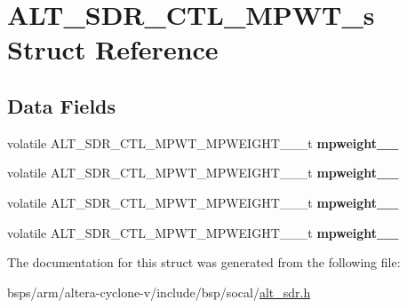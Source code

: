\hypertarget{structALT__SDR__CTL__MPWT__s}{}\section{A\+L\+T\+\_\+\+S\+D\+R\+\_\+\+C\+T\+L\+\_\+\+M\+P\+W\+T\+\_\+s Struct Reference}
\label{structALT__SDR__CTL__MPWT__s}
\subsection*{Data Fields}
\begin{DoxyCompactItemize}
\item 
\mbox{\label{structALT__SDR__CTL__MPWT__s_a8217dca5a6d326567c57b4a605819ce1}} 
volatile A\+L\+T\+\_\+\+S\+D\+R\+\_\+\+C\+T\+L\+\_\+\+M\+P\+W\+T\+\_\+\+M\+P\+W\+E\+I\+G\+H\+T\+\_\+\_\+\_\+t {\bfseries mpweight\+\_\+\_}
\item 
\mbox{\label{structALT__SDR__CTL__MPWT__s_adb50c502a3e5c5439330502b0781d3ba}} 
volatile A\+L\+T\+\_\+\+S\+D\+R\+\_\+\+C\+T\+L\+\_\+\+M\+P\+W\+T\+\_\+\+M\+P\+W\+E\+I\+G\+H\+T\+\_\+\_\+\_\+t {\bfseries mpweight\+\_\+\_}
\item 
\mbox{\label{structALT__SDR__CTL__MPWT__s_a573f146a5c4249771c9cef588979ef70}} 
volatile A\+L\+T\+\_\+\+S\+D\+R\+\_\+\+C\+T\+L\+\_\+\+M\+P\+W\+T\+\_\+\+M\+P\+W\+E\+I\+G\+H\+T\+\_\+\_\+\_\+t {\bfseries mpweight\+\_\+\_}
\item 
\mbox{\label{structALT__SDR__CTL__MPWT__s_a417168a0dd61fa2d3db6c3d9421651fe}} 
volatile A\+L\+T\+\_\+\+S\+D\+R\+\_\+\+C\+T\+L\+\_\+\+M\+P\+W\+T\+\_\+\+M\+P\+W\+E\+I\+G\+H\+T\+\_\+\_\+\_\+t {\bfseries mpweight\+\_\+\_}
\end{DoxyCompactItemize}


The documentation for this struct was generated from the following file\+:\begin{DoxyCompactItemize}
\item 
bsps/arm/altera-\/cyclone-\/v/include/bsp/socal/\mbox{\hyperlink{alt__sdr_8h}{alt\+\_\+sdr.\+h}}\end{DoxyCompactItemize}

